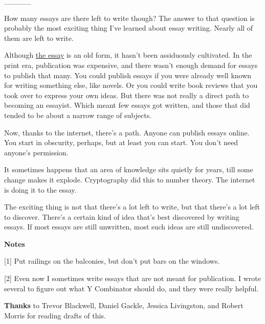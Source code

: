 \_\_\_\_\_

How many essays are there left to write though? The answer to that
question is probably the most exciting thing I've learned about essay
writing. Nearly all of them are left to write.

Although \href{essay.html}{the essay} is an old form, it hasn't been
assiduously cultivated. In the print era, publication was expensive, and
there wasn't enough demand for essays to publish that many. You could
publish essays if you were already well known for writing something
else, like novels. Or you could write book reviews that you took over to
express your own ideas. But there was not really a direct path to
becoming an essayist. Which meant few essays got written, and those that
did tended to be about a narrow range of subjects.

Now, thanks to the internet, there's a path. Anyone can publish essays
online. You start in obscurity, perhaps, but at least you can start. You
don't need anyone's permission.

It sometimes happens that an area of knowledge sits quietly for years,
till some change makes it explode. Cryptography did this to number
theory. The internet is doing it to the essay.

The exciting thing is not that there's a lot left to write, but that
there's a lot left to discover. There's a certain kind of idea that's
best discovered by writing essays. If most essays are still unwritten,
most such ideas are still undiscovered.

\textbf{Notes}

{[}1{]} Put railings on the balconies, but don't put bars on the
windows.

{[}2{]} Even now I sometimes write essays that are not meant for
publication. I wrote several to figure out what Y Combinator should do,
and they were really helpful.

\textbf{Thanks} to Trevor Blackwell, Daniel Gackle, Jessica Livingston,
and Robert Morris for reading drafts of this.
